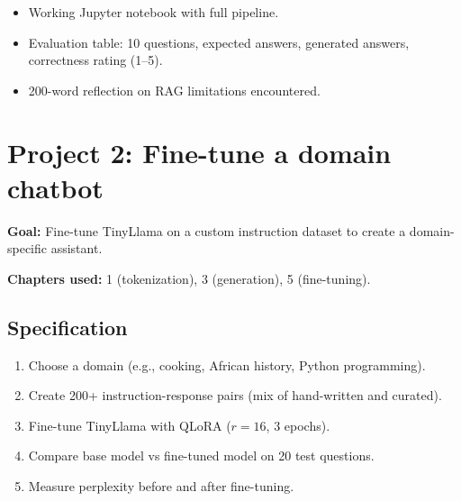 \begin{itemize}
  \item Working Jupyter notebook with full pipeline.
  \item Evaluation table: 10 questions, expected answers, generated answers, correctness rating (1--5).
  \item 200-word reflection on RAG limitations encountered.
\end{itemize}

\section{Project 2: Fine-tune a domain chatbot}

\textbf{Goal:} Fine-tune TinyLlama on a custom instruction dataset to create a domain-specific assistant.

\textbf{Chapters used:} 1 (tokenization), 3 (generation), 5 (fine-tuning).

\subsection{Specification}

\begin{enumerate}
  \item Choose a domain (e.g., cooking, African history, Python programming).
  \item Create 200+ instruction-response pairs (mix of hand-written and curated).
  \item Fine-tune TinyLlama with QLoRA ($r=16$, 3 epochs).
  \item Compare base model vs fine-tuned model on 20 test questions.
  \item Measure perplexity before and after fine-tuning.
\end{enumerate}

